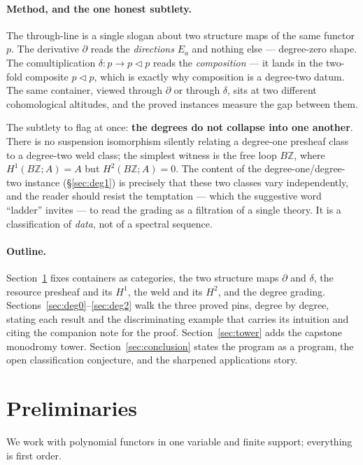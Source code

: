 \documentclass[11pt]{article}
\theoremstyle{definition}
\newcommand{\Z}{\mathbb{Z}}
\newcommand{\lto}{\!\lhd\!}
\begin{document}
\paragraph{Method, and the one honest subtlety.}
The through-line is a single slogan about two structure maps of the same functor $p$. The
derivative $\partial$ reads the \emph{directions} $E_a$ and nothing else --- degree-zero shape. The
comultiplication $\delta\colon p\to p\lto p$ reads the \emph{composition} --- it lands in the
two-fold composite $p\lto p$, which is exactly why composition is a degree-two datum. The same
container, viewed through $\partial$ or through $\delta$, sits at two different cohomological
altitudes, and the proved instances measure the gap between them.

The subtlety to flag at once: \textbf{the degrees do not collapse into one another}. There is no
suspension isomorphism silently relating a degree-one presheaf class to a degree-two weld class;
the simplest witness is the free loop $B\Z$, where $H^1(B\Z;A)=A$ but $H^2(B\Z;A)=0$. The content
of the degree-one/degree-two instance (\S\ref{sec:deg1}) is precisely that these two classes vary
independently, and the reader should resist the temptation --- which the suggestive word ``ladder''
invites --- to read the grading as a filtration of a single theory. It is a classification of
\emph{data}, not of a spectral sequence.

\paragraph{Outline.} Section~\ref{sec:prelim} fixes containers as categories, the two structure
maps $\partial$ and $\delta$, the resource presheaf and its $H^1$, the weld and its $H^2$, and the
degree grading. Sections~\ref{sec:deg0}--\ref{sec:deg2} walk the three proved pins, degree by
degree, stating each result and the discriminating example that carries its intuition and citing
the companion note for the proof. Section~\ref{sec:tower} adds the capstone monodromy tower.
Section~\ref{sec:conclusion} states the program as a program, the open classification conjecture,
and the sharpened applications story.

\section{Preliminaries}\label{sec:prelim}

We work with polynomial functors in one variable and finite support; everything is first order.
\end{document}
